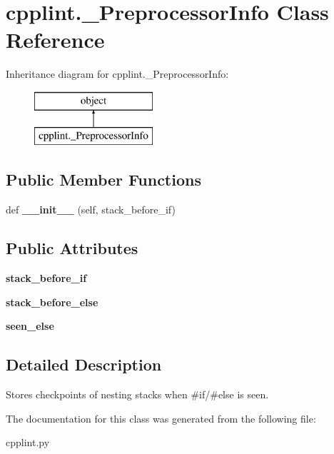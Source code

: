 \hypertarget{classcpplint_1_1__PreprocessorInfo}{}\section{cpplint.\+\_\+\+Preprocessor\+Info Class Reference}
\label{classcpplint_1_1__PreprocessorInfo}
Inheritance diagram for cpplint.\+\_\+\+Preprocessor\+Info\+:\begin{figure}[H]
\begin{center}
\leavevmode
\includegraphics[height=2.000000cm]{classcpplint_1_1__PreprocessorInfo}
\end{center}
\end{figure}
\subsection*{Public Member Functions}
\begin{DoxyCompactItemize}
\item 
def {\bfseries \+\_\+\+\_\+init\+\_\+\+\_\+} (self, stack\+\_\+before\+\_\+if)\hypertarget{classcpplint_1_1__PreprocessorInfo_a1394d17434a22d32b0ea9d6424e5c47b}{}\label{classcpplint_1_1__PreprocessorInfo_a1394d17434a22d32b0ea9d6424e5c47b}

\end{DoxyCompactItemize}
\subsection*{Public Attributes}
\begin{DoxyCompactItemize}
\item 
{\bfseries stack\+\_\+before\+\_\+if}\hypertarget{classcpplint_1_1__PreprocessorInfo_a0681b2adca3171a495fc1eca43d245c0}{}\label{classcpplint_1_1__PreprocessorInfo_a0681b2adca3171a495fc1eca43d245c0}

\item 
{\bfseries stack\+\_\+before\+\_\+else}\hypertarget{classcpplint_1_1__PreprocessorInfo_a34a80f1f97808614b7062ba1e5bbf2b9}{}\label{classcpplint_1_1__PreprocessorInfo_a34a80f1f97808614b7062ba1e5bbf2b9}

\item 
{\bfseries seen\+\_\+else}\hypertarget{classcpplint_1_1__PreprocessorInfo_a7587e84a1e6db34c3c94317f5a5931cc}{}\label{classcpplint_1_1__PreprocessorInfo_a7587e84a1e6db34c3c94317f5a5931cc}

\end{DoxyCompactItemize}


\subsection{Detailed Description}
\begin{DoxyVerb}Stores checkpoints of nesting stacks when #if/#else is seen.\end{DoxyVerb}
 

The documentation for this class was generated from the following file\+:\begin{DoxyCompactItemize}
\item 
cpplint.\+py\end{DoxyCompactItemize}
